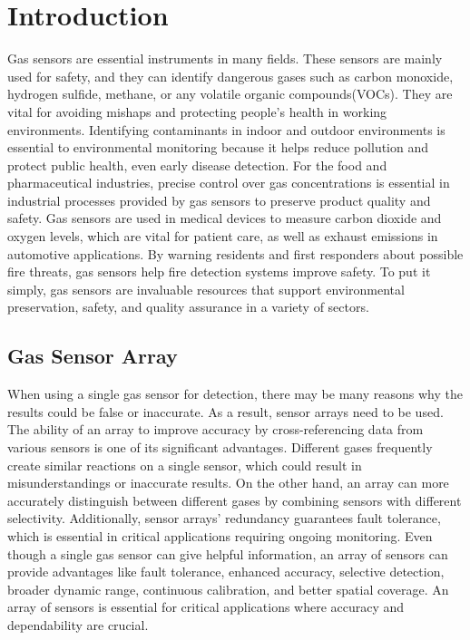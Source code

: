 \chapter{Introduction} 
Gas sensors are essential instruments in many fields. These sensors are mainly used for safety, and they can identify dangerous gases such as carbon monoxide, hydrogen sulfide, methane, or any volatile organic compounds(VOCs).\cite{singh2024metal} They are vital for avoiding mishaps and protecting people's health in working environments. Identifying contaminants in indoor and outdoor environments is essential to environmental monitoring\cite{shitashima2010evolution} because it helps reduce pollution and protect public health, even early disease detection. For the food \cite{acock1995simple} and pharmaceutical industries\cite{severinghaus1986history}, precise control over gas concentrations is essential in industrial processes provided by gas sensors to preserve product quality and safety. Gas sensors are used in medical devices to measure carbon dioxide and oxygen levels, which are vital for patient care, as well as exhaust emissions in automotive applications. By warning residents and first responders about possible fire threats, gas sensors help fire detection systems improve safety. To put it simply, gas sensors are invaluable resources that support environmental preservation, safety, and quality assurance in a variety of sectors.

\section{Gas Sensor Array}
When using a single gas sensor for detection, there may be many reasons why the results could be false or inaccurate. As a result, sensor arrays need to be used. The ability of an array to improve accuracy by cross-referencing data from various sensors is one of its significant advantages. Different gases frequently create similar reactions on a single sensor, which could result in misunderstandings or inaccurate results. On the other hand, an array can more accurately distinguish between different gases by combining sensors with different selectivity.
Additionally, sensor arrays' redundancy guarantees fault tolerance, which is essential in critical applications requiring ongoing monitoring. Even though a single gas sensor can give helpful information, an array of sensors can provide advantages like fault tolerance, enhanced accuracy, selective detection, broader dynamic range, continuous calibration, and better spatial coverage. An array of sensors is essential for critical applications where accuracy and dependability are crucial.

